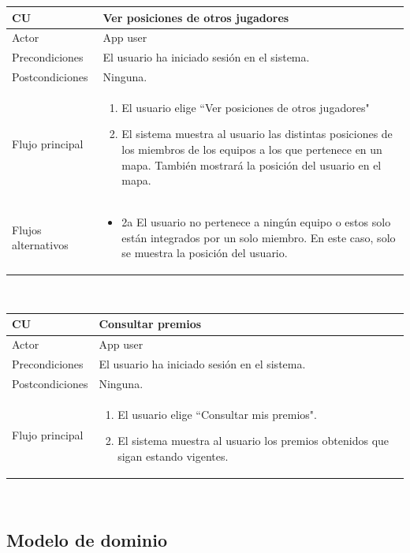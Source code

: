 \documentclass[twoside]{report}
\newcommand\addrow[2]{#1 &#2\\ }
\newcommand\addheading[2]{#1 &#2\\ \hline}
\newcommand\tabularhead{\begin{tabular}{lp{0.7\textwidth}}
\hline
}
\newenvironment{usecase}{\tabularhead}
{\hline\end{tabular}}
\begin{document}
\begin{usecase}
  \addheading{\textbf{CU\arabic{usecase}}}{Ver posiciones de otros jugadores} 
  \addrow{Actor}{App user}
  \addrow{Precondiciones}{El usuario ha iniciado sesión en el sistema.}
  \addrow{Postcondiciones}{Ninguna.}
  \addrow{Flujo principal}{
  		\begin{enumerate}
  		\item El usuario elige “Ver posiciones de otros jugadores"
  		\item El sistema muestra al usuario las distintas posiciones de los miembros de los equipos a los que pertenece en un mapa. También mostrará la posición del usuario en el mapa.
  		\end{enumerate}
  }
  \addrow{Flujos alternativos}{
  		\begin{itemize}
  		\item 2a El usuario no pertenece a ningún equipo o estos solo están integrados por un solo miembro. En este caso, solo se muestra la posición del usuario.
  		\end{itemize}
  }
\end{usecase}\\

\begin{usecase}
  \addheading{\textbf{CU\arabic{usecase}}}{Consultar premios} 
  \addrow{Actor}{App user}
  \addrow{Precondiciones}{El usuario ha iniciado sesión en el sistema.}
  \addrow{Postcondiciones}{Ninguna.}
  \addrow{Flujo principal}{
  		\begin{enumerate}
  		\item El usuario elige “Consultar mis premios".
  		\item El sistema muestra al usuario los premios obtenidos que sigan estando vigentes.
  		\end{enumerate}
  }
\end{usecase}\\

\subsection{Modelo de dominio}
\end{document}
